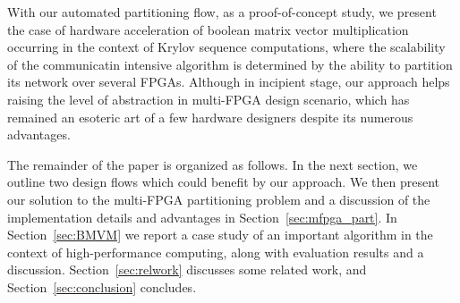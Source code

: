 \documentclass[conference, 9pt]{IEEEtran}
\newcommand{\blue}[1]{\textcolor{blue}{#1}}
\begin{document}

With our automated partitioning flow, as a proof-of-concept study, we present the case of hardware acceleration of
boolean matrix vector multiplication occurring in the context of Krylov sequence computations, where the scalability of the communicatin intensive algorithm is 
determined by the ability to partition its network over several FPGAs. Although in incipient stage, our 
approach helps raising the level of abstraction in multi-FPGA design scenario, which has remained an esoteric art of a few hardware designers despite its numerous advantages. 

The remainder of the paper is organized as follows. In the next section, we outline two design flows
which could benefit by our approach. We then present our solution to the multi-FPGA partitioning problem and a discussion of the implementation details
and advantages in Section~\ref{sec:mfpga_part}. In Section~\ref{sec:BMVM} we report a case study of an important algorithm in the context of high-performance computing, along with evaluation results and a discussion. Section~\ref{sec:relwork} discusses some related work, and Section~\ref{sec:conclusion} concludes.
\end{document}
